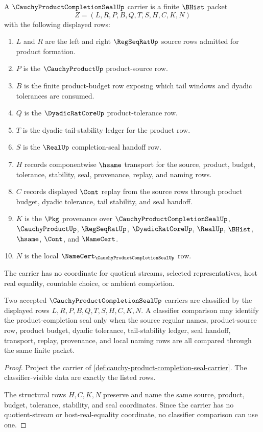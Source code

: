 \begin{definition}
\label{def:cauchy-product-completion-seal-carrier}
A $\CauchyProductCompletionSealUp$ carrier is a finite $\BHist$ packet
$$
Z=(L,R,P,B,Q,T,S,H,C,K,N)
$$
with the following displayed rows:
\begin{enumerate}
\item $L$ and $R$ are the left and right $\RegSeqRatUp$ source rows admitted for product formation.
\item $P$ is the $\CauchyProductUp$ product-source row.
\item $B$ is the finite product-budget row exposing which tail windows and dyadic tolerances are consumed.
\item $Q$ is the $\DyadicRatCoreUp$ product-tolerance row.
\item $T$ is the dyadic tail-stability ledger for the product row.
\item $S$ is the $\RealUp$ completion-seal handoff row.
\item $H$ records componentwise $\hsame$ transport for the source, product, budget, tolerance, stability, seal, provenance, replay, and naming rows.
\item $C$ records displayed $\Cont$ replay from the source rows through product budget, dyadic tolerance, tail stability, and seal handoff.
\item $K$ is the $\Pkg$ provenance over $\CauchyProductCompletionSealUp$, $\CauchyProductUp$, $\RegSeqRatUp$, $\DyadicRatCoreUp$, $\RealUp$, $\BHist$, $\hsame$, $\Cont$, and $\NameCert$.
\item $N$ is the local $\NameCert_{\CauchyProductCompletionSealUp}$ row.
\end{enumerate}
The carrier has no coordinate for quotient streams, selected representatives, host real equality, countable choice, or ambient completion.
\end{definition}

\begin{theorem}
\label{thm:cauchy-product-completion-seal-classifier}
Two accepted $\CauchyProductCompletionSealUp$ carriers are classified by the displayed rows $L,R,P,B,Q,T,S,H,C,K,N$. A classifier comparison may identify the product-completion seal only when the source regular names, product-source row, product budget, dyadic tolerance, tail-stability ledger, seal handoff, transport, replay, provenance, and local naming rows are all compared through the same finite packet.
\end{theorem}
\begin{proof}
Project the carrier of \autoref{def:cauchy-product-completion-seal-carrier}. The classifier-visible data are exactly the listed rows.

The structural rows $H,C,K,N$ preserve and name the same source, product, budget, tolerance, stability, and seal coordinates. Since the carrier has no quotient-stream or host-real-equality coordinate, no classifier comparison can use one.
\end{proof}

